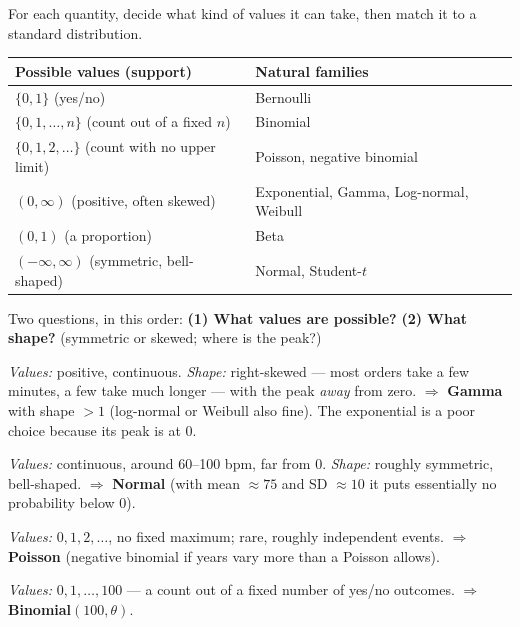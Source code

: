 \documentclass[11pt]{article}
\begin{document}
\begin{restate}
For each quantity, decide what kind of values it can take, then match it to a standard distribution.
\end{restate}

\begin{recall}
\begin{center}
\begin{tabular}{ll}\toprule
Possible values (support) & Natural families\\\midrule
$\{0,1\}$ (yes/no) & Bernoulli\\
$\{0,1,\dots,n\}$ (count out of a fixed $n$) & Binomial\\
$\{0,1,2,\dots\}$ (count with no upper limit) & Poisson, negative binomial\\
$(0,\infty)$ (positive, often skewed) & Exponential, Gamma, Log-normal, Weibull\\
$(0,1)$ (a proportion) & Beta\\
$(-\infty,\infty)$ (symmetric, bell-shaped) & Normal, Student-$t$\\\bottomrule
\end{tabular}
\end{center}
\end{recall}

\begin{keyidea}
Two questions, in this order: \textbf{(1) What values are possible?} \textbf{(2) What shape?} (symmetric or skewed; where is the peak?)
\end{keyidea}

\solution
{}
\emph{Values:} positive, continuous. \emph{Shape:} right-skewed --- most orders take a few minutes, a few take much longer --- with the peak \emph{away} from zero.
$\Rightarrow$ \textbf{Gamma} with shape $>1$ (log-normal or Weibull also fine). The exponential is a poor choice because its peak is at 0.

\emph{Values:} continuous, around 60--100 bpm, far from 0. \emph{Shape:} roughly symmetric, bell-shaped.
$\Rightarrow$ \textbf{Normal} (with mean $\approx75$ and SD $\approx10$ it puts essentially no probability below 0).

\emph{Values:} $0,1,2,\dots$, no fixed maximum; rare, roughly independent events.
$\Rightarrow$ \textbf{Poisson} (negative binomial if years vary more than a Poisson allows).

\emph{Values:} $0,1,\dots,100$ --- a count out of a fixed number of yes/no outcomes.
$\Rightarrow$ \textbf{Binomial}$(100,\theta)$.
\end{document}
